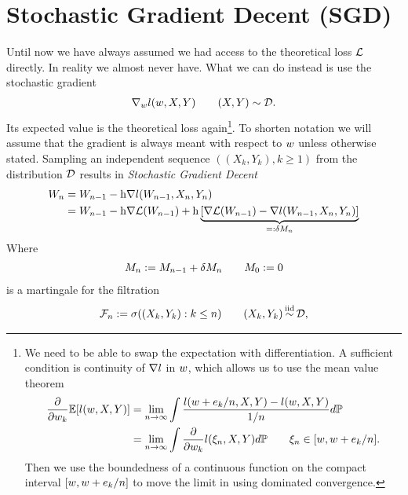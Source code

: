 
\chapter{Stochastic Gradient Decent (SGD)}

Until now we have always assumed we had access to the theoretical loss \(\mathcal{L}\) 
directly. In reality we almost never have. What we can do instead is use the
stochastic gradient
%
\begin{align*}
	\nabla_wl (w, X,Y) \qquad (X,Y)\sim\mathcal{D}.
\end{align*}
%
Its expected value is the theoretical loss again\footnote{
	We need to be able to swap the expectation with differentiation. A sufficient 
	condition is continuity of \(\nabla l\) in \(w\), which allows us
	to use the mean value theorem
	\begin{align*}
		\frac{\partial}{\partial w_k}\mathbb{E}[l(w, X,Y)]
		&= \lim_{n\to\infty}
		\int\frac{l(w+e_k/n, X,Y)-l(w,X,Y)}{1/n}d\mathbb{P}
		\\
		&=\lim_{n\to\infty} \int\frac{\partial}{\partial w_k}l(\xi_n, X,Y)d\mathbb{P}
		\qquad \xi_n \in [w, w + e_k/n].
	\end{align*}
	Then we use the boundedness of a continuous function on the compact interval
	\([w, w + e_k/n]\) to move the limit in using
	dominated convergence.
}. To shorten notation we will assume that the gradient is always meant
with respect to \(w\) unless otherwise stated.
Sampling an independent sequence \(((X_k,Y_k), k\ge 1)\) from the 
distribution \(\mathcal{D}\) results in \emph{Stochastic Gradient Decent}
%
\begin{align*}
	W_n
	&= W_{n-1} - \text{h}\nabla l(W_{n-1}, X_n,Y_n)\\
	&= W_{n-1} - \text{h}\nabla\mathcal{L}(W_{n-1})
	+ \text{h}\underbrace{
		[\nabla\mathcal{L}(W_{n-1}) - \nabla l(W_{n-1}, X_n, Y_n)]
	}_{=:\delta M_n}
\end{align*}
Where
\begin{align*}
	M_n := M_{n-1} + \delta M_n \qquad M_0:=0
\end{align*}
is a martingale for the filtration
\begin{align*}
	\filtration_n :=\sigma((X_k, Y_k): k\le n )
	\qquad (X_k,Y_k)\stackrel{\text{iid}}{\sim}\dist,
\end{align*}

